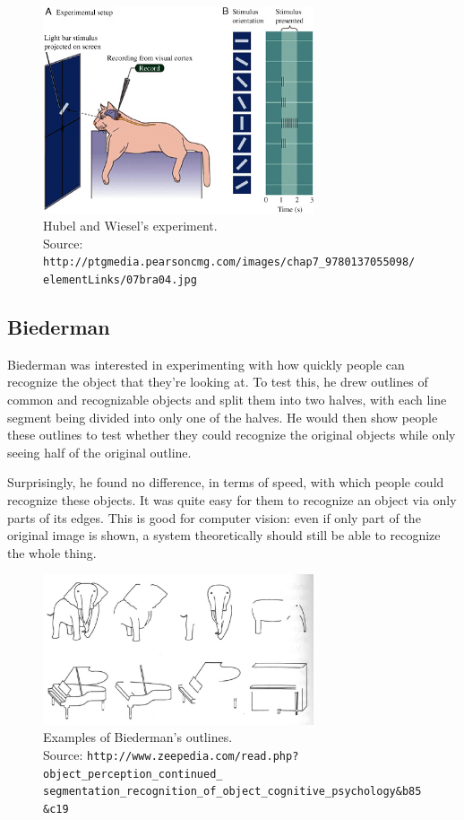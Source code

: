 \documentclass{article}
\begin{document}
\begin{figure}[H]
\caption{Hubel and Wiesel's experiment. \\
Source: \texttt{http://ptgmedia.pearsoncmg.com/images/chap7\_9780137055098/\\
elementLinks/07bra04.jpg}}
\centering
\includegraphics[width=8cm]{hubel_wiesel_cat.jpg}
\end{figure}

\subsection{Biederman}
Biederman was interested in experimenting with how quickly people can recognize the object that they're looking at. To test this, he drew outlines of common and recognizable objects and split them into two halves, with each line segment being divided into only one of the halves. He would then show people these outlines to test whether they could recognize the original objects while only seeing half of the original outline. \newline

Surprisingly, he found no difference, in terms of speed, with which people could recognize these objects. It was quite easy for them to recognize an object via only parts of its edges. This is good for computer vision: even if only part of the original image is shown, a system theoretically should still be able to recognize the whole thing.

\begin{figure}[H]
\caption{Examples of Biederman's outlines. \\
Source: \texttt{http://www.zeepedia.com/read.php?object\_perception\_continued\_ \\ segmentation\_recognition\_of\_object\_cognitive\_psychology\&b\=85\&c\=19}}
\centering
\includegraphics[width=8cm]{biederman_outlines.png}
\end{figure}
\end{document}
